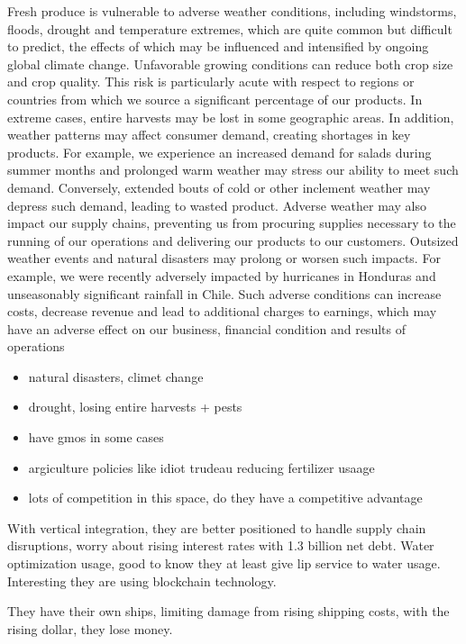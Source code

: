 Fresh produce is vulnerable to adverse weather conditions, including windstorms, floods, drought and temperature extremes, which are quite common but difficult to predict, the effects of
which may be influenced and intensified by ongoing global climate change. Unfavorable growing conditions can reduce both crop size and crop quality. This risk is particularly acute with respect to
regions or countries from which we source a significant percentage of our products. In extreme cases, entire harvests may be lost in some geographic areas. In addition, weather patterns may affect
consumer demand, creating shortages in key products. For example, we experience an increased demand for salads during summer months and prolonged warm weather may stress our ability to meet
such demand. Conversely, extended bouts of cold or other inclement weather may depress such demand, leading to wasted product. Adverse weather may also impact our supply chains, preventing us
from procuring supplies necessary to the running of our operations and delivering our products to our customers. Outsized weather events and natural disasters may prolong or worsen such impacts.
For example, we were recently adversely impacted by hurricanes in Honduras and unseasonably significant rainfall in Chile. Such adverse conditions can increase costs, decrease revenue and lead to
additional charges to earnings, which may have an adverse effect on our business, financial condition and results of operations

\begin{itemize}
    \item natural disasters, climet change
    \item drought, losing entire harvests + pests
    \item have gmos in some cases
    \item argiculture policies like idiot trudeau reducing fertilizer usaage
    \item lots of competition in this space, do they have a competitive advantage
\end{itemize}

With vertical integration, they are better positioned to handle supply chain disruptions, worry about rising interest rates with 1.3 billion net debt. Water optimization usage, good to know they at least give lip service to water usage. Interesting they are using blockchain technology.

They have their own ships, limiting damage from rising shipping costs, with the rising dollar, they lose money.

